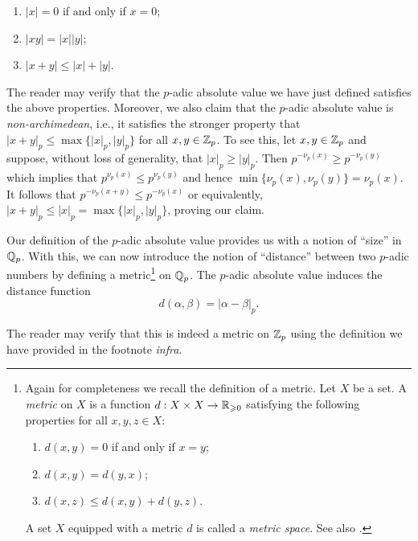 \smallskip

\begin{enumerate}[nosep, label=(\roman*)]
    \item \(|x| = 0\) if and only if \(x = 0\);\label{item:abs-val-zero}
    \item \(|xy| = |x||y|\);\label{item:abs-val-product}
    \item \(|x + y| \leq |x| + |y|\).\label{item:abs-val-sum}
\end{enumerate}

The reader may verify that the \(p\)-adic absolute value we have just defined satisfies the above properties. Moreover, we also claim that the \(p\)-adic absolute value is \emph{non-archimedean}, i.e., it satisfies the stronger property that \(|x + y|_p \leq \max\{|x|_p, |y|_p\}\) for all \(x, y \in \mathbb{Z}_p\). To see this, let \(x, y \in \mathbb{Z}_p\) and suppose, without loss of generality, that \(|x|_p \geq |y|_p\). Then \(p^{-\nu_p(x)} \geq p^{-\nu_p(y)}\) which implies that \(p^{\nu_p(x)} \leq p^{\nu_p(y)}\) and hence \(\min\{\nu_p(x), \nu_p(y)\} = \nu_p(x)\). It follows that \(p^{-\nu_p(x + y)} \leq p^{-\nu_p(x)}\) or equivalently, \(|x + y|_p \leq |x|_p = \max\{|x|_p, |y|_p\}\), proving our claim.

Our definition of the \(p\)-adic absolute value provides us with a notion of ``size'' in \(\mathbb{Q}_p\). With this, we can now introduce the notion of ``distance'' between two \(p\)-adic numbers by defining a metric\footnote{
    Again for completeness we recall the definition of a metric. Let \(X\) be a set. A \emph{metric} on \(X\) is a function \(d : X \times X \to \mathbb{R}_{\geqslant 0}\) satisfying the following properties for all \(x, y, z \in X\):
    \begin{enumerate}[nosep, label=(\roman*)]
        \item \(d(x, y) = 0\) if and only if \(x = y\);\label{item:metric-zero}
        \item \(d(x, y) = d(y, x)\);\label{item:metric-symmetry}
        \item \(d(x, z) \leq d(x, y) + d(y, z)\).\label{item:metric-triangle}
    \end{enumerate}
    A set \(X\) equipped with a metric \(d\) is called a \emph{metric space}. See also \cite[p.~30]{rudin1976principles}.
} on \(\mathbb{Q}_p\). The \(p\)-adic absolute value induces the distance function
\[
  d(\alpha, \beta) = |\alpha - \beta|_p.
\]

The reader may verify that this is indeed a metric on \(\mathbb{Z}_p\) using the definition we have provided in the footnote \emph{infra}.

